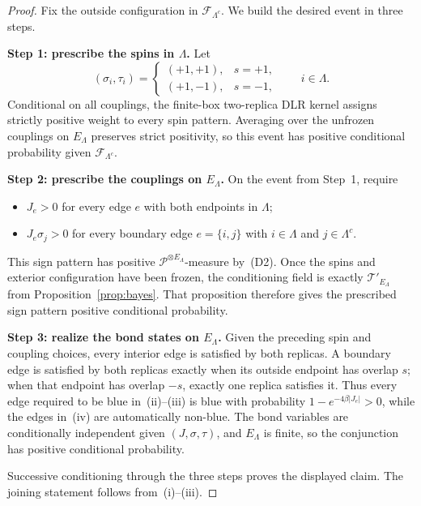 \documentclass[10pt,a4paper]{amsart}
\begin{document}
\begin{proof}
Fix the outside configuration in $\mathscr{F}_{\Lambda^c}$.
We build the desired event in three steps.

\medskip\noindent
\textbf{Step 1: prescribe the spins in $\Lambda$.}
Let
\[
  (\sigma_i,\tau_i)=
  \begin{cases}
    (+1,+1),&s=+1,\\
    (+1,-1),&s=-1,
  \end{cases}
  \qquad i\in\Lambda.
\]
Conditional on all couplings, the finite-box two-replica DLR kernel assigns strictly positive weight to every spin pattern.
Averaging over the unfrozen couplings on $E_\Lambda$ preserves strict positivity, so this event has positive conditional probability given $\mathscr{F}_{\Lambda^c}$.

\medskip\noindent
\textbf{Step 2: prescribe the couplings on $E_\Lambda$.}
On the event from Step~1, require
\begin{itemize}
\item $J_e>0$ for every edge $e$ with both endpoints in $\Lambda$;
\item $J_e\sigma_j>0$ for every boundary edge $e=\{i,j\}$ with $i\in\Lambda$ and $j\in\Lambda^c$.
\end{itemize}
This sign pattern has positive $\mathscr{P}^{\otimes E_\Lambda}$-measure by~\textup{(D2)}.
Once the spins and exterior configuration have been frozen, the conditioning field is exactly $\mathcal{T}'_{E_\Lambda}$ from Proposition~\ref{prop:bayes}.
That proposition therefore gives the prescribed sign pattern positive conditional probability.

\medskip\noindent
\textbf{Step 3: realize the bond states on $E_\Lambda$.}
Given the preceding spin and coupling choices, every interior edge is satisfied by both replicas.
A boundary edge is satisfied by both replicas exactly when its outside endpoint has overlap $s$; when that endpoint has overlap $-s$, exactly one replica satisfies it.
Thus every edge required to be blue in~\textup{(ii)}--\textup{(iii)} is blue with probability
$1-e^{-4\beta|J_e|}>0$, while the edges in~\textup{(iv)} are automatically non-blue.
The bond variables are conditionally independent given $(J,\sigma,\tau)$, and $E_\Lambda$ is finite, so the conjunction has positive conditional probability.

Successive conditioning through the three steps proves the displayed claim.
The joining statement follows from~\textup{(i)}--\textup{(iii)}.
\end{proof}
\end{document}
